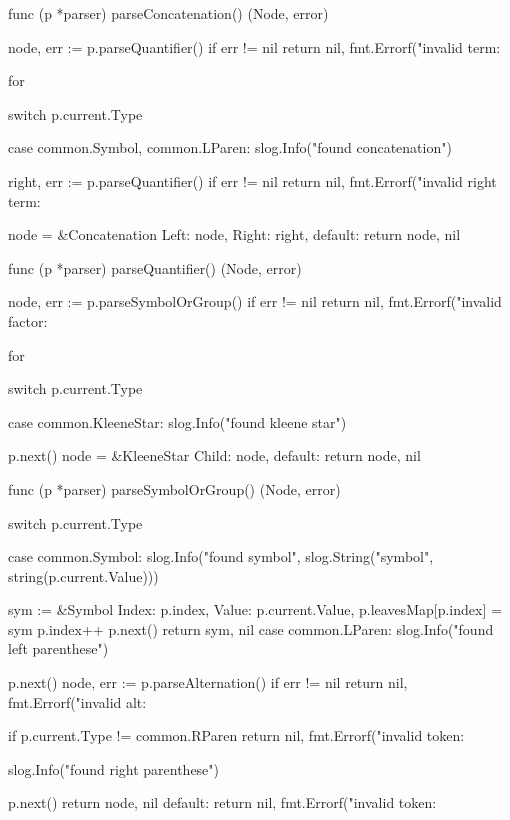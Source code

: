 func (p *parser) parseConcatenation() (Node, error) {
	node, err := p.parseQuantifier()
	if err != nil {
		return nil, fmt.Errorf("invalid term: %
	}

	for {
		switch p.current.Type {
		case common.Symbol, common.LParen:
			slog.Info("found concatenation")

			right, err := p.parseQuantifier()
			if err != nil {
				return nil, fmt.Errorf("invalid right term: %
			}

			node = &Concatenation{
				Left:  node,
				Right: right,
			}
		default:
			return node, nil
		}
	}
}

func (p *parser) parseQuantifier() (Node, error) {
	node, err := p.parseSymbolOrGroup()
	if err != nil {
		return nil, fmt.Errorf("invalid factor: %
	}

	for {
		switch p.current.Type {
		case common.KleeneStar:
			slog.Info("found kleene star")

			p.next()
			node = &KleeneStar{
				Child: node,
			}
		default:
			return node, nil
		}
	}
}

func (p *parser) parseSymbolOrGroup() (Node, error) {
	switch p.current.Type {
	case common.Symbol:
		slog.Info("found symbol", slog.String("symbol", string(p.current.Value)))

		sym := &Symbol{
			Index: p.index,
			Value: p.current.Value,
		}
		p.leavesMap[p.index] = sym
		p.index++
		p.next()
		return sym, nil
	case common.LParen:
		slog.Info("found left parenthese")

		p.next()
		node, err := p.parseAlternation()
		if err != nil {
			return nil, fmt.Errorf("invalid alt: %
		}

		if p.current.Type != common.RParen {
			return nil, fmt.Errorf("invalid token: %
		}

		slog.Info("found right parenthese")

		p.next()
		return node, nil
	default:
		return nil, fmt.Errorf("invalid token: %
	}
}

